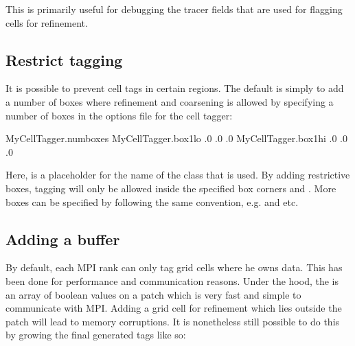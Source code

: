 \documentclass[letterpaper,10pt,english]{sphinxmanual}
\begin{document}
\sphinxAtStartPar
This is primarily useful for debugging the tracer fields that are used for flagging cells for refinement.


\subsection{Restrict tagging}
\label{\detokenize{Source/CellTagger:restrict-tagging}}
\sphinxAtStartPar
It is possible to prevent cell tags in certain regions.
The default is simply to add a number of boxes where refinement and coarsening is allowed by specifying a number of boxes in the options file for the cell tagger:

\begin{sphinxVerbatim}[commandchars=\\\{\},formatcom=\scriptsize]
MyCellTagger.num\PYGZus{}boxes                
MyCellTagger.box1\PYGZus{}lo      .0 .0 .0  
MyCellTagger.box1\PYGZus{}hi      .0 .0 .0  
\end{sphinxVerbatim}

\sphinxAtStartPar
Here,  is a placeholder for the name of the class that is used.
By adding restrictive boxes, tagging will only be allowed inside the specified box corners  and .
More boxes can be specified by following the same convention, e.g.  and  etc.


\subsection{Adding a buffer}
\label{\detokenize{Source/CellTagger:adding-a-buffer}}
\sphinxAtStartPar
By default, each MPI rank can only tag grid cells where he owns data.
This has been done for performance and communication reasons.
Under the hood, the  is an array of boolean values on a patch which is very fast and simple to communicate with MPI.
Adding a grid cell for refinement which lies outside the patch will lead to memory corruptions.
It is nonetheless still possible to do this by growing the final generated tags like so:
\end{document}
